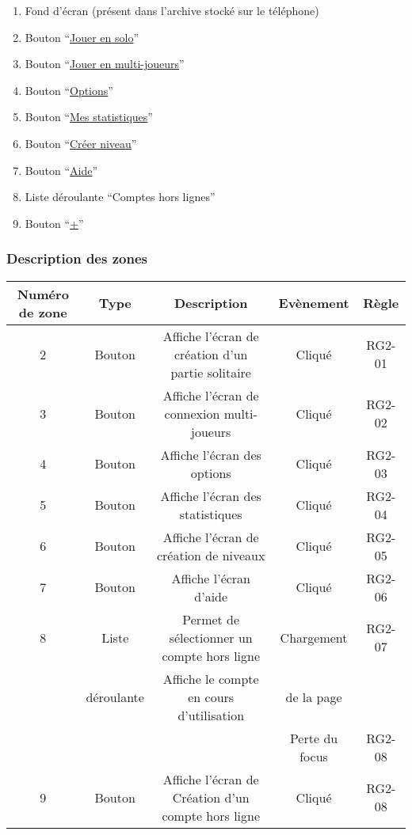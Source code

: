 \documentclass{report}
\begin{document}
		\begin{center}	
			
		\end{center}

		\begin{enumerate}
		  \item Fond d'écran (présent dans l'archive stocké sur le téléphone)
		  \item Bouton ``\hyperlink{Creer partie solo}{Jouer en solo}''
		  \item Bouton ``\hyperlink{Connexion multi-joueurs}{Jouer en multi-joueurs}''
		  \item Bouton ``\hyperlink{Options}{Options}''
		  \item Bouton ``\hyperlink{Statistiques}{Mes statistiques}''
		  \item Bouton ``\hyperlink{Creer niveau}{Créer niveau}''
		  \item Bouton ``\hyperlink{Aide}{Aide}''
		  \item Liste déroulante ``Comptes hors lignes''
		  \item Bouton ``\hyperlink{profil}{+}''
		\end{enumerate}

		\subsubsection{Description des zones}
		
		\begin{tabular}{|c|c|c|c|c|} \hline
			Numéro de zone & Type  & Description & Evènement &	Règle \\\hline 
			2 & Bouton & Affiche l'écran de création d'un partie solitaire & Cliqué & RG2-01 \\\hline
			3 & Bouton & Affiche l'écran de connexion multi-joueurs & Cliqué & RG2-02 \\\hline
			4 & Bouton & Affiche l'écran des options & Cliqué & RG2-03 \\\hline
			5 & Bouton & Affiche l'écran des statistiques & Cliqué & RG2-04 \\\hline
			6 & Bouton & Affiche l'écran de création de niveaux & Cliqué & RG2-05 \\\hline
			7 & Bouton & Affiche l'écran d'aide & Cliqué & RG2-06 \\\hline
			8 & Liste & Permet de sélectionner un compte hors ligne & Chargement  & RG2-07 \\ 
			  & déroulante & Affiche le compte en cours d'utilisation & de la page & \\
			  &            &                                          & Perte du focus & RG2-08\\\hline
			9 & Bouton & Affiche l'écran de Création d'un compte hors ligne & Cliqué & RG2-08 \\\hline
			
		\end{tabular}
		
\end{document}
